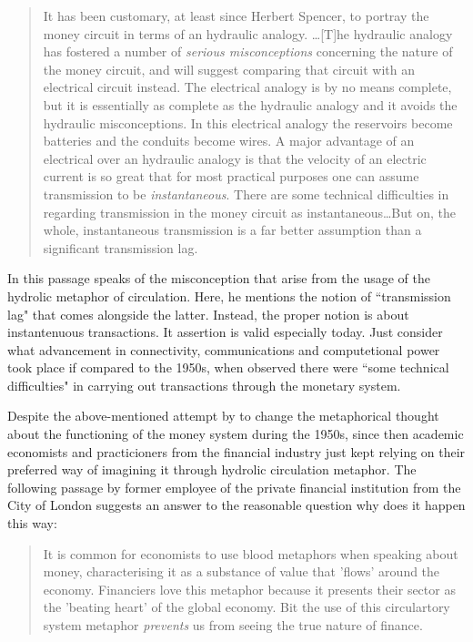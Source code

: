 \begin{quote}
It has been customary, at least since Herbert Spencer, to portray the money circuit in terms of an hydraulic analogy. \dots [T]he hydraulic analogy has fostered a number of \textit{serious misconceptions} concerning the nature of the money circuit, and will suggest comparing that circuit with an electrical circuit instead. The electrical analogy is by no means complete, but it is essentially as complete as the hydraulic analogy and it avoids the hydraulic misconceptions. In this electrical analogy the reservoirs become batteries and the conduits become wires. A major advantage of an electrical over an hydraulic analogy is that the velocity of an electric current is so great that for most practical purposes one can assume transmission to be \textit{instantaneous}. There are some technical difficulties in regarding transmission in the money circuit as instantaneous\dots But on, the whole, instantaneous transmission is a far better assumption than a significant transmission lag. \citep[pp.~29-30]{copeland1952}
\end{quote}

In this passage \citeauthor{copeland1952} speaks of the misconception that arise from the usage of the hydrolic metaphor of circulation. Here, he mentions the notion of ``transmission lag" that comes alongside the latter. Instead, the proper notion is about instantenuous transactions. It assertion is valid especially today. Just consider what advancement in connectivity, communications and computetional power took place if compared to the 1950s, when \citeauthor{copeland1952} observed there were ``some technical difficulties" in carrying out transactions through the monetary system.

Despite the above-mentioned attempt by \citeauthor{copeland1952} to change the metaphorical thought about the functioning of the money system during the 1950s, since then academic economists and practicioners from the financial industry just kept relying on their preferred way of imagining it through hydrolic circulation metaphor.  The following passage by former employee of the private financial institution from the City of London suggests an answer to the reasonable question why does it happen this way:

\begin{quote}
It is common for economists to use blood metaphors when speaking about money, characterising it as a substance of value that 'flows' around the economy. Financiers love this metaphor because it presents their sector as the 'beating heart' of the global economy. Bit the use of this circulartory system metaphor \textit{prevents} us from seeing the true nature of finance. \citep[p.~20]{scott2022}
\end{quote}

